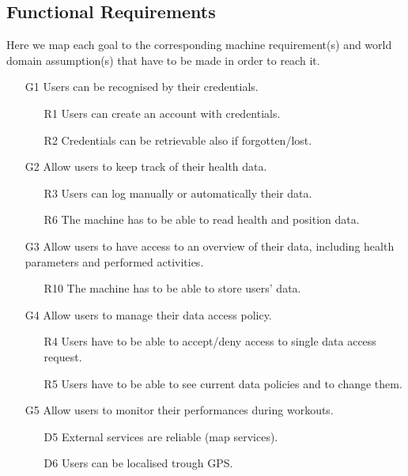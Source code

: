 \documentclass{article}
\begin{document}
\newpage
\subsection{Functional Requirements}	

Here we map each goal to the corresponding machine requirement(s) and 
world domain assumption(s) that have to be made in order to reach it.

\begin{itemize}	

	\item [G1] Users can be recognised by their credentials.
	\begin{itemize}
		\item [R1] Users can create an account with credentials.
		\item [R2] Credentials can be retrievable also if 
		forgotten/lost.
	\end{itemize} 

	\item [G2] Allow users to keep track of their health data.	
	\begin{itemize}
		\item [R3] Users can log manually or automatically their data.
		\item [R6] The machine has to be able to read health and 
		position data.
	\end{itemize}
	
	\item [G3] Allow users to have access to an overview of their 
	data, including health parameters and performed activities.
	\begin{itemize}
		\item [R10] The machine has to be able to store users’ data.
	\end{itemize}
	
	\item [G4] Allow users to manage their data access policy.
	\begin{itemize}
		\item [R4] Users have to be able to accept/deny access to 
		single data access request.
		\item [R5] Users have to be able to see current data policies
		and to change them.
	\end{itemize}
	
	\item [G5] Allow users to monitor their performances during 
	workouts.	
	\begin{itemize}
		\item [D5] External services are reliable (map services).
		\item [D6] Users can be localised trough GPS.
	\end{itemize}	
	

\end{itemize}
\end{document}
